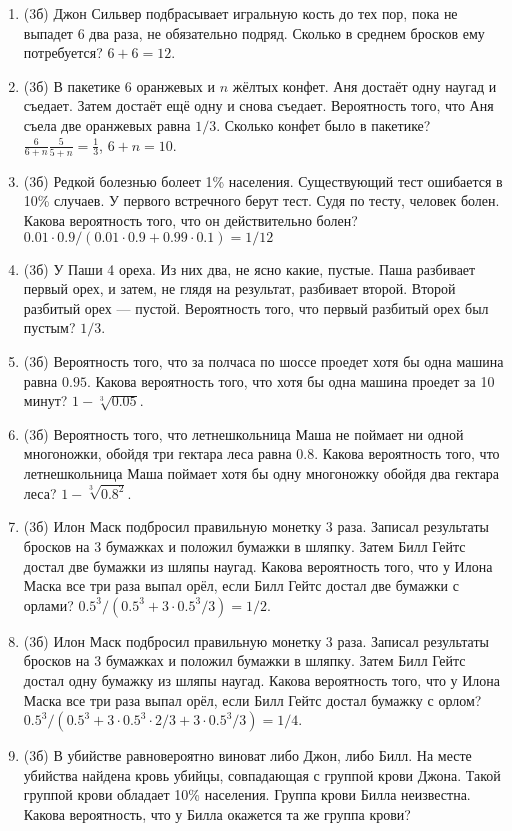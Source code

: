 \documentclass[a4paper, 12pt]{article}
\begin{document}
\begin{enumerate}
\item (3б) Джон Сильвер подбрасывает игральную кость до тех пор, пока не выпадет 6 два раза, не обязательно подряд. Сколько в среднем бросков ему потребуется? $6+6=12$.
\item (3б) В пакетике 6 оранжевых и $n$ жёлтых конфет. Аня достаёт одну наугад и съедает. Затем достаёт ещё одну и снова съедает. Вероятность того, что Аня съела две оранжевых равна $1/3$. Сколько конфет было в пакетике? $\frac{6}{6+n}\frac{5}{5+n}=\frac{1}{3}$, $6+n=10$.
\item (3б) Редкой болезнью болеет 1\% населения. Существующий тест ошибается в 10\% случаев. У первого встречного берут тест. Судя по тесту, человек болен. Какова вероятность того, что он действительно болен? $0.01\cdot 0.9/(0.01 \cdot 0.9 + 0.99 \cdot 0.1)=1/12$
\item (3б) У Паши 4 ореха. Из них два, не ясно какие, пустые. Паша разбивает первый орех, и затем, не глядя на результат, разбивает второй. Второй разбитый орех — пустой. Вероятность того, что первый разбитый орех был пустым? $1/3$.
\item (3б) Вероятность того, что за полчаса по шоссе проедет хотя бы одна машина равна $0.95$. 
Какова вероятность того, что хотя бы одна машина проедет за 10 минут? $1 - \sqrt[3]{0.05}$.
\item (3б) Вероятность того, что летнешкольница Маша не поймает ни одной многоножки, обойдя три гектара леса равна $0.8$. 
Какова вероятность того, что летнешкольница Маша поймает хотя бы одну многоножку обойдя два гектара леса? $1 - \sqrt[3]{0.8^2}$. 
\item (3б) Илон Маск подбросил правильную монетку 3 раза. Записал результаты бросков на 3 бумажках и положил бумажки в шляпку. 
Затем Билл Гейтс достал две бумажки из шляпы наугад. Какова вероятность того, что у Илона Маска все три раза выпал орёл,
если Билл Гейтс достал две бумажки с орлами? $0.5^3 / (0.5^3 + 3 \cdot 0.5^3 /3 ) = 1/2$.
\item (3б) Илон Маск подбросил правильную монетку 3 раза. Записал результаты бросков на 3 бумажках и положил бумажки в шляпку. 
Затем Билл Гейтс достал одну бумажку из шляпы наугад. Какова вероятность того, что у Илона Маска все три раза выпал орёл,
если Билл Гейтс достал бумажку с орлом? $0.5^3 / (0.5^3 + 3 \cdot 0.5^3 \cdot 2/3 + 3\cdot 0.5^3 / 3) = 1/4$.
\item (3б) В убийстве равновероятно виноват либо Джон, либо Билл. На месте убийства найдена кровь убийцы, совпадающая с группой крови Джона. 
Такой группой крови обладает 10\% населения. Группа крови Билла неизвестна. Какова вероятность, что у Билла окажется та же группа крови?

\end{enumerate}
\end{document}
